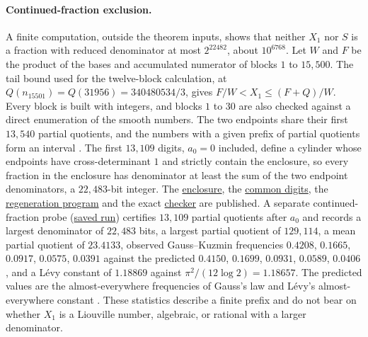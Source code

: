 \documentclass[11pt]{article}
\theoremstyle{remark}
\theoremstyle{plain}
\begin{document}
\paragraph{Continued-fraction exclusion.}
\label{long269:res:cf-exclusion}
A finite computation, outside the theorem inputs, shows that neither
$X_1$ nor $S$ is a fraction with reduced denominator at most
$2^{22482}$, about $10^{6768}$.  Let $W$ and $F$ be the product of the bases and
accumulated numerator of blocks $1$ to $15{,}500$.  The tail bound used
for the twelve-block calculation, at $Q(n_{15501})=Q(31956)=340480534/3$,
gives $F/W<X_1\le(F+Q)/W$.  Every block is built with integers, and
blocks $1$ to $30$ are also checked against a direct enumeration of the
smooth numbers.  The two endpoints share their first $13{,}540$ partial
quotients, and the numbers with a given prefix of partial quotients form
an interval \cite[Lemma~10.1.2, p.~106]{bosmaCF}.  The first $13{,}109$
digits, $a_0=0$ included, define a cylinder whose endpoints have
cross-determinant $1$ and strictly contain the enclosure, so every
fraction in the enclosure has denominator at least the sum of the two
endpoint denominators, a $22{,}483$-bit integer.  The
\href{https://github.com/wcook04/plectis-erdos/blob/f757115e03bebe5c04431a147da559015c680a37/research/experiments/erdos269/large-computations/regenerated/tail_certificate.json}{enclosure},
the
\href{https://github.com/wcook04/plectis-erdos/blob/f757115e03bebe5c04431a147da559015c680a37/research/experiments/erdos269/large-computations/regenerated/cf_common_prefix.json}{common digits},
the
\href{https://github.com/wcook04/plectis-erdos/blob/f757115e03bebe5c04431a147da559015c680a37/research/experiments/erdos269/large-computations/regenerate_269.py}{regeneration program}
and the exact
\href{https://github.com/wcook04/plectis-erdos/blob/f757115e03bebe5c04431a147da559015c680a37/research/experiments/erdos269/large-computations/verify_recovered.py}{checker}
are published.  A separate continued-fraction probe
(\href{https://github.com/wcook04/plectis-erdos/blob/f757115e03bebe5c04431a147da559015c680a37/research/experiments/erdos269/large-computations/receipts/cf-statistics.json}{saved run})
certifies $13{,}109$ partial quotients after $a_0$ and records
a largest denominator of $22{,}483$ bits, a largest partial quotient of
$129{,}114$, a mean partial quotient of $23.4133$, observed Gauss--Kuzmin
frequencies $0.4208$, $0.1665$, $0.0917$, $0.0575$, $0.0391$ against the
predicted $0.4150$, $0.1699$, $0.0931$, $0.0589$, $0.0406$, and a L\'evy
constant of $1.18869$ against $\pi^{2}/(12\log2)=1.18657$.  The predicted
values are the almost-everywhere frequencies of Gauss's law and L\'evy's
almost-everywhere constant \cite[pp.~288--289 and footnote~5]{levy1936}.
These statistics describe a finite prefix and do not bear on whether $X_1$ is a
Liouville number, algebraic, or rational with a larger denominator.
\end{document}
